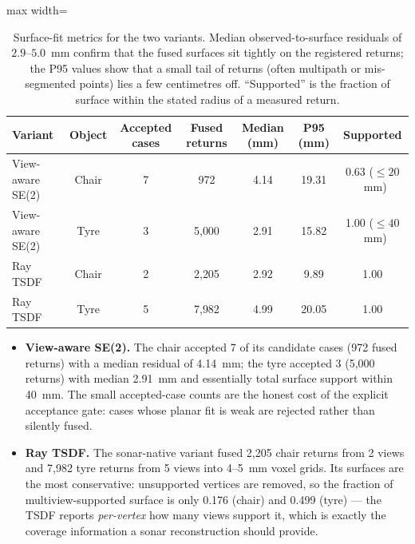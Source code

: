 \begin{table}[H]
  \centering
  \small
  \begin{adjustbox}{max width=\textwidth}
  \begin{tabular}{@{}lcccccc@{}}
    \toprule
    Variant & Object & Accepted cases & Fused returns & Median (mm) & P95 (mm) & Supported \\
    \midrule
    View-aware SE(2) & Chair & 7 & 972 & 4.14 & 19.31 & 0.63 ($\le 20$~mm) \\
    View-aware SE(2) & Tyre  & 3 & 5{,}000 & 2.91 & 15.82 & 1.00 ($\le 40$~mm) \\
    Ray TSDF & Chair & 2 & 2{,}205 & 2.92 & 9.89 & 1.00 \\
    Ray TSDF & Tyre  & 5 & 7{,}982 & 4.99 & 20.05 & 1.00 \\
    \bottomrule
  \end{tabular}
  \end{adjustbox}
  \caption{Surface-fit metrics for the two \routeA{} variants. Median
  observed-to-surface residuals of $2.9$--$5.0$~mm confirm that the fused
  surfaces sit tightly on the registered returns; the P95 values show that a
  small tail of returns (often multipath or mis-segmented points) lies a few
  centimetres off. ``Supported'' is the fraction of surface within the stated
  radius of a measured return.}
  \label{tab:routeA_metrics}
\end{table}

\begin{itemize}
  \item \textbf{View-aware SE(2).} The chair accepted 7 of its candidate
  cases (972 fused returns) with a median residual of 4.14~mm; the tyre
  accepted 3 (5{,}000 returns) with median 2.91~mm and essentially total
  surface support within 40~mm. The small accepted-case counts are the honest
  cost of the explicit acceptance gate: cases whose planar fit is weak are
  rejected rather than silently fused.
  \item \textbf{Ray TSDF.} The sonar-native variant fused 2,205 chair returns
  from 2 views and 7,982 tyre returns from 5 views into 4--5~mm voxel grids.
  Its surfaces are the most conservative: unsupported vertices are removed, so
  the fraction of multiview-supported surface is only 0.176 (chair) and 0.499
  (tyre) --- the TSDF reports \emph{per-vertex} how many views support it,
  which is exactly the coverage information a sonar reconstruction should
  provide.
\end{itemize}

